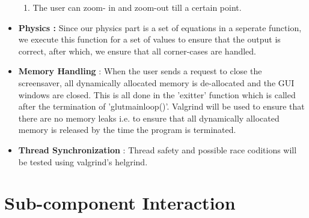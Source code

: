 \documentclass[]{article}
\begin{document}
\begin{itemize}
\begin{enumerate}
\item { The user can zoom- in and zoom-out till a certain point. }

\end{enumerate}

\item \textbf{Physics :} Since our physics part is a set of equations in a seperate function, we execute this function for a set of values to ensure that the output is correct, after which, we ensure that all corner-cases are handled.

\item \textbf{Memory Handling} : When the user sends a request to close the screensaver, all dynamically allocated memory is de-allocated and the GUI windows are closed. This is all done in the 'exitter' function which is called after the termination of 'glutmainloop()'. Valgrind will be used to ensure that there are no memory leaks i.e. to ensure that all dynamically allocated memory is released by the time the program is terminated. 

\item \textbf{Thread Synchronization} : Thread safety and possible race coditions will be tested using valgrind's helgrind.

\end{itemize}


\section{Sub-component Interaction}
\end{document}
